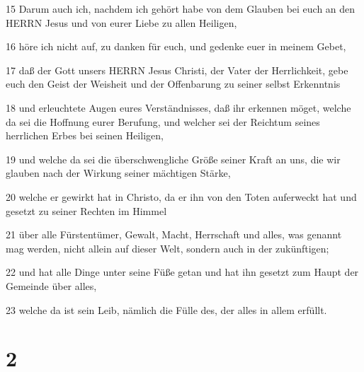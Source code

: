 \par 15 Darum auch ich, nachdem ich gehört habe von dem Glauben bei euch an den HERRN Jesus und von eurer Liebe zu allen Heiligen,
\par 16 höre ich nicht auf, zu danken für euch, und gedenke euer in meinem Gebet,
\par 17 daß der Gott unsers HERRN Jesus Christi, der Vater der Herrlichkeit, gebe euch den Geist der Weisheit und der Offenbarung zu seiner selbst Erkenntnis
\par 18 und erleuchtete Augen eures Verständnisses, daß ihr erkennen möget, welche da sei die Hoffnung eurer Berufung, und welcher sei der Reichtum seines herrlichen Erbes bei seinen Heiligen,
\par 19 und welche da sei die überschwengliche Größe seiner Kraft an uns, die wir glauben nach der Wirkung seiner mächtigen Stärke,
\par 20 welche er gewirkt hat in Christo, da er ihn von den Toten auferweckt hat und gesetzt zu seiner Rechten im Himmel
\par 21 über alle Fürstentümer, Gewalt, Macht, Herrschaft und alles, was genannt mag werden, nicht allein auf dieser Welt, sondern auch in der zukünftigen;
\par 22 und hat alle Dinge unter seine Füße getan und hat ihn gesetzt zum Haupt der Gemeinde über alles,
\par 23 welche da ist sein Leib, nämlich die Fülle des, der alles in allem erfüllt.

\chapter{2}

